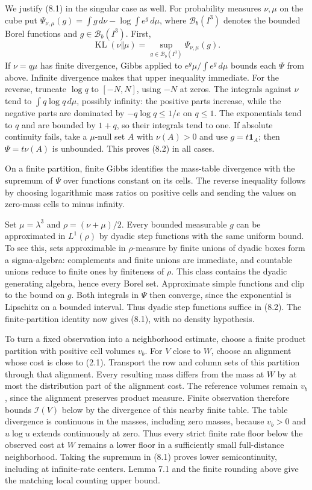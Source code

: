 \documentclass[english,11pt,a4paper]{article}
\begin{document}
We justify (8.1) in the singular case as well. For probability measures \(\nu,\mu\) on the cube put \(\Psi_{\nu,\mu}(g)=\int g\,d\nu-\log\int e^g\,d\mu\), where \(\mathcal B_b(I^3)\) denotes the bounded Borel functions and \(g\in\mathcal B_b(I^3)\). First, \[\operatorname{KL}(\nu\Vert\mu)=\sup_{g\in\mathcal B_b(I^3)}\Psi_{\nu,\mu}(g).
\tag{8.2}\] If \(\nu=q\mu\) has finite divergence, Gibbs applied to \(e^g\mu/\int e^g\,d\mu\) bounds each \(\Psi\) from above. Infinite divergence makes that upper inequality immediate. For the reverse, truncate \(\log q\) to \([-N,N]\), using \(-N\) at zeros. The integrals against \(\nu\) tend to \(\int q\log q\,d\mu\), possibly infinity: the positive parts increase, while the negative parts are dominated by \(-q\log q\le1/e\) on \(q\le1\). The exponentials tend to \(q\) and are bounded by \(1+q\), so their integrals tend to one. If absolute continuity fails, take a \(\mu\)-null set \(A\) with \(\nu(A)>0\) and use \(g=t\mathbf1_A\); then \(\Psi=t\nu(A)\) is unbounded. This proves (8.2) in all cases.

On a finite partition, finite Gibbs identifies the mass-table divergence with the supremum of \(\Psi\) over functions constant on its cells. The reverse inequality follows by choosing logarithmic mass ratios on positive cells and sending the values on zero-mass cells to minus infinity.

Set \(\mu=\lambda^3\) and \(\rho=(\nu+\mu)/2\). Every bounded measurable \(g\) can be approximated in \(L^1(\rho)\) by dyadic step functions with the same uniform bound. To see this, sets approximable in \(\rho\)-measure by finite unions of dyadic boxes form a sigma-algebra: complements and finite unions are immediate, and countable unions reduce to finite ones by finiteness of \(\rho\). This class contains the dyadic generating algebra, hence every Borel set. Approximate simple functions and clip to the bound on \(g\). Both integrals in \(\Psi\) then converge, since the exponential is Lipschitz on a bounded interval. Thus dyadic step functions suffice in (8.2). The finite-partition identity now gives (8.1), with no density hypothesis.

To turn a fixed observation into a neighborhood estimate, choose a finite product partition with positive cell volumes \(v_b\). For \(V\) close to \(W\), choose an alignment whose cost is close to (2.1). Transport the row and column sets of this partition through that alignment. Every resulting mass differs from the mass at \(W\) by at most the distribution part of the alignment cost. The reference volumes remain \(v_b\), since the alignment preserves product measure. Finite observation therefore bounds \(\mathcal I(V)\) below by the divergence of this nearby finite table. The table divergence is continuous in the masses, including zero masses, because \(v_b>0\) and \(u\log u\) extends continuously at zero. Thus every strict finite rate floor below the observed cost at \(W\) remains a lower floor in a sufficiently small full-distance neighborhood. Taking the supremum in (8.1) proves lower semicontinuity, including at infinite-rate centers. Lemma 7.1 and the finite rounding above give the matching local counting upper bound.
\end{document}
